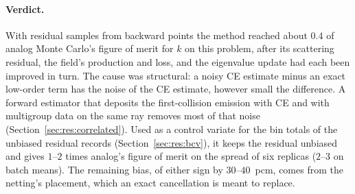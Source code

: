 \documentclass[11pt]{article}
\theoremstyle{definition}
\begin{document}
\paragraph{Verdict.} With residual samples from backward points the method reached about $0.4$ of
analog Monte Carlo's figure of merit for $k$ on this problem, after its scattering residual, the
field's production and loss, and the eigenvalue update had each been improved in turn. The cause was
structural: a noisy CE estimate minus an exact low-order term has the noise of the CE estimate,
however small the difference. A forward estimator that deposits the first-collision emission with CE
and with multigroup data on the same ray removes most of that noise
(Section~\ref{sec:res:correlated}). Used as a control variate for the bin totals of the unbiased
residual records (Section~\ref{sec:res:bcv}), it keeps the residual unbiased and gives $1$--$2$ times
analog's figure of merit on the spread of six replicas ($2$--$3$ on batch means). The remaining bias,
of either sign by $30$--$40$~pcm, comes from the netting's placement, which an exact cancellation is
meant to replace.
\clearpage





\appendix

\end{document}
